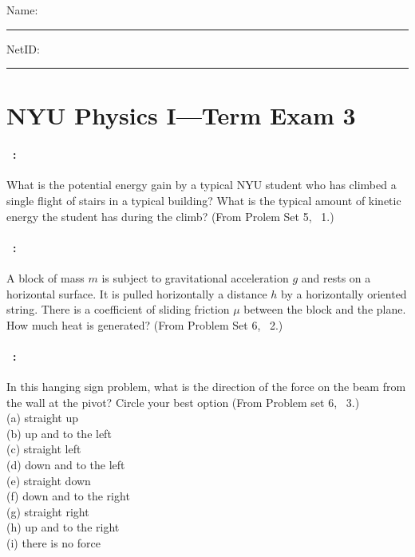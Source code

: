 \documentclass[12pt]{article} 
\begin{document}
\noindent
Name: \rule[-1ex]{0.55\textwidth}{0.1pt}
NetID: \rule[-1ex]{0.2\textwidth}{0.1pt}

\section*{NYU Physics I---Term Exam 3}

\paragraph{\problemname~\theproblem:}%
What is the potential energy gain by a typical NYU student who has
climbed a single flight of stairs in a typical building? What is the
typical amount of kinetic energy the student has during the climb?
(From Prolem Set 5, \problemname~1.)

\vfill

\paragraph{\problemname~\theproblem:}%
A block of mass $m$ is subject to gravitational acceleration $g$ and
rests on a horizontal surface. It is pulled horizontally a distance
$h$ by a horizontally oriented string. There is a coefficient of
sliding friction $\mu$ between the block and the plane. How much heat
is generated?  (From Problem Set 6, \problemname~2.)

\vfill

\paragraph{\problemname~\theproblem:}%
In this hanging sign problem, what is the direction of the force on
the beam from the wall at the pivot? Circle your best option (From Problem set 6,
\problemname~3.)\\
(a) straight up\\
(b) up and to the left\\
(c) straight left\\
(d) down and to the left\\
(e) straight down\\
(f) down and to the right\\
(g) straight right\\
(h) up and to the right\\
(i) there is no force
\end{document}
